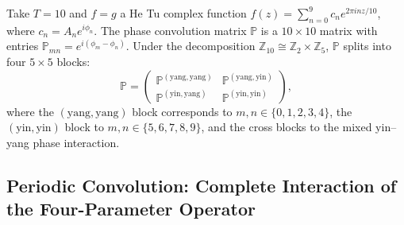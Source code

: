 \begin{example}\label{ex:hetu_phase_convolution}
Take $T = 10$ and $f = g$ a He Tu complex function $f(z) = \sum_{n=0}^{9} c_n e^{2\pi i n z/10}$, where $c_n = A_n e^{i\phi_n}$. The phase convolution matrix $\mathbb{P}$ is a $10 \times 10$ matrix with entries $\mathbb{P}_{mn} = e^{i(\phi_m - \phi_n)}$. Under the decomposition $\mathbb{Z}_{10} \cong \mathbb{Z}_2 \times \mathbb{Z}_5$, $\mathbb{P}$ splits into four $5 \times 5$ blocks:
\[
\mathbb{P} = \begin{pmatrix} \mathbb{P}^{(\text{yang},\text{yang})} & \mathbb{P}^{(\text{yang},\text{yin})} \\ \mathbb{P}^{(\text{yin},\text{yang})} & \mathbb{P}^{(\text{yin},\text{yin})} \end{pmatrix},
\]
where the $(\text{yang},\text{yang})$ block corresponds to $m, n \in \{0,1,2,3,4\}$, the $(\text{yin},\text{yin})$ block to $m, n \in \{5,6,7,8,9\}$, and the cross blocks to the mixed yin--yang phase interaction.
\end{example}

\subsection{\texorpdfstring{Periodic Convolution: Complete Interaction of the Four-Parameter Operator}{Periodic Convolution}}
\label{subsec:periodic_convolution_series}


